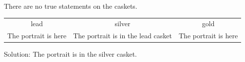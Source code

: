 There are no true statements on the caskets.
\begin{tabular}{ccc}
\toprule
lead & silver & gold\\
The portrait is here & The portrait is in the lead casket & The portrait is here\\
\bottomrule
\end{tabular}
Solution: The portrait is in the silver casket.